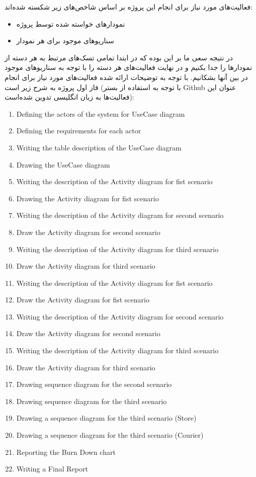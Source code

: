 \documentclass[]{article}
\begin{document}
فعالیت‌های مورد نیاز برای انجام این پروژه بر اساس شاخص‌های زیر شکسته
شده‌اند:

\begin{itemize}
\item
  نمودارهای خواسته شده توسط پروژه
\item
  سناریوهای موجود برای هر نمودار
\end{itemize}

در نتیجه سعی ما بر این بوده که در ابتدا تمامی تسک‌های مرتبط به هر دسته
از نمودارها را جدا بکنیم و در نهایت فعالیت‌های هر دسته را با توجه به
سناریوهای موجود در بین آنها بشکانیم. با توجه به توضیحات ارائه شده
فعالیت‌های مورد نیاز برای انجام فاز اول پروژه به شرح زیر است (با توجه به
استفاده از بستر Github عنوان این فعالیت‌ها به زبان انگلیسی تدوین
شده‌است):

\begin{enumerate}
\def\labelenumi{\arabic{enumi})}
\item
  Defining the actors of the system for UseCase diagram
\item
  Defining the requirements for each actor
\item
  Writing the table description of the UseCase diagram
\item
  Drawing the UseCase diagram
\item
  Writing the description of the Activity diagram for fist scenario
\item
  Drawing the Activity diagram for fist scenario
\item
  Writing the description of the Activity diagram for second scenario
\item
  Draw the Activity diagram for second scenario
\item
  Writing the description of the Activity diagram for third scenario
\item
  Draw the Activity diagram for third scenario
\item
  Writing the description of the Activity diagram for fist scenario
\item
  Draw the Activity diagram for fist scenario
\item
  Writing the description of the Activity diagram for second scenario
\item
  Draw the Activity diagram for second scenario
\item
  Writing the description of the Activity diagram for third scenario
\item
  Draw the Activity diagram for third scenario
\item
  Drawing sequence diagram for the second scenario
\item
  Drawing sequence diagram for the third scenario
\item
  Drawing a sequence diagram for the third scenario (Store)
\item
  Drawing a sequence diagram for the third scenario (Courier)
\item
  Reporting the Burn Down chart
\item
  Writing a Final Report
\end{enumerate}
\end{document}
